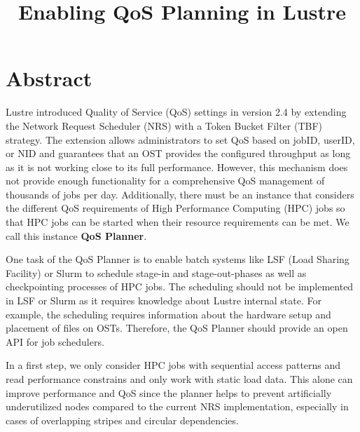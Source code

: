 \documentclass[10pt]{article}
\title{Enabling QoS Planning in Lustre}
\begin{document}
\maketitle

\section{Abstract}

Lustre introduced Quality of Service (QoS) settings in version 2.4 by extending the Network Request Scheduler (NRS) with a Token Bucket Filter (TBF) strategy.
The extension allows administrators to set QoS based on jobID, userID, or NID and guarantees that an OST provides the configured throughput as long as it is not working close to its full performance.
However, this mechanism does not provide enough functionality for a comprehensive QoS management of thousands of jobs per day.
Additionally, there must be an instance that considers the different QoS requirements of High Performance Computing (HPC) jobs so that HPC jobs can be started when their resource requirements can be met.
We call this instance \textbf{QoS Planner}.

One task of the QoS Planner is to enable batch systems like LSF (Load Sharing Facility) or Slurm to schedule stage-in and stage-out-phases as well as checkpointing processes of HPC jobs.
The scheduling should not be implemented in LSF or Slurm as it requires knowledge about Lustre internal state.
For example, the scheduling requires information about the hardware setup and placement of files on OSTs.
Therefore, the QoS Planner should provide an open API for job schedulers.

In a first step, we only consider HPC jobs with sequential access patterns and read performance constrains and only work with static load data.
This alone can improve performance and QoS since the planner helps to prevent artificially underutilized nodes compared to the current NRS implementation, especially in cases of overlapping stripes and circular dependencies.

\end{document}
